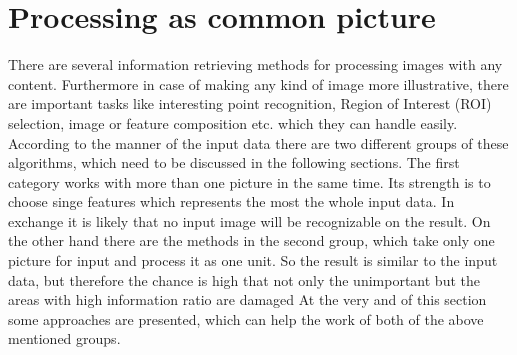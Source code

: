\documentclass[draft,final]{vutinfth} %
\begin{document}
\section{Processing as common picture}
There are several information retrieving methods for processing images with any content.
Furthermore in case of making any kind of image more illustrative, there are important tasks like interesting point recognition, Region of Interest (ROI) selection, image or feature composition etc. which they can handle easily.
According to the manner of the input data there are two different groups of these algorithms, which need to be discussed in the following sections.
The first category works with more than one picture in the same time.
Its strength is to choose singe features which represents the most the whole input data. 
In exchange it is likely that no input image will be recognizable on the result.
On the other hand there are the methods in the second group, which take only one picture for input and process it as one unit.
So the result is similar to the input data, but therefore the chance is high that not only the unimportant but the areas with high information ratio are damaged
At the very and of this section some approaches are presented, which can help the work of both of the above mentioned groups.
\end{document}
